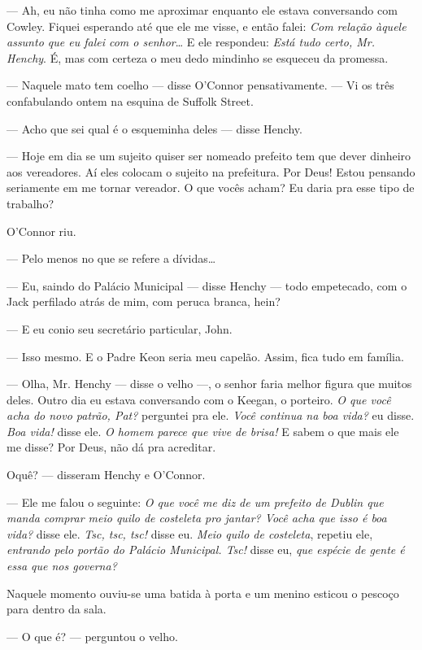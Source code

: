 --- Ah, eu não tinha como me aproximar enquanto ele estava conversando
com Cowley. Fiquei esperando até que ele me visse, e então falei:
\textit{Com relação àquele assunto que eu falei com o senhor}\ldots{} E ele respondeu:
\textit{Está tudo certo, Mr. Henchy}. É, mas com certeza o meu dedo mindinho se
esqueceu da promessa.

--- Naquele mato tem coelho --- disse O'Connor pensativamente. --- Vi
os três confabulando ontem na esquina de Suffolk Street.

--- Acho que sei qual é o esqueminha deles --- disse Henchy.

--- Hoje em dia se um sujeito quiser ser nomeado prefeito tem que
dever dinheiro aos vereadores. Aí eles colocam o sujeito na
prefeitura. Por Deus! Estou pensando seriamente em me tornar
vereador. O que vocês acham? Eu daria pra esse tipo de trabalho?

O'Connor riu.

--- Pelo menos no que se refere a dívidas\ldots{}

--- Eu, saindo do Palácio Municipal --- disse Henchy --- todo
empetecado, com o Jack perfilado atrás de mim, com peruca branca,
hein?

--- E eu conio seu secretário particular, John.

--- Isso mesmo. E o Padre Keon seria meu capelão. Assim, fica tudo em
família.

--- Olha, Mr. Henchy --- disse o velho ---, o senhor faria melhor
figura que muitos deles. Outro dia eu estava conversando com o Keegan,
o porteiro. \textit{O que você acha do novo patrão, Pat?} perguntei pra ele.
\textit{Você continua na boa vida?} eu disse. \textit{Boa vida!} disse
ele. \textit{O homem parece que vive de brisa!} E sabem o que mais ele me disse? Por Deus,
não dá pra acreditar.

Oquê? --- disseram Henchy e O'Connor.

--- Ele me falou o seguinte: \textit{O que você me diz de um prefeito de
Dublin que manda comprar meio quilo de costeleta pro jantar? Você acha
que isso é boa vida?} disse ele. \textit{Tsc, tsc, tsc!} disse eu.
\textit{Meio quilo de costeleta}, repetiu ele, \textit{entrando pelo portão do Palácio Municipal.
Tsc!} disse eu, \textit{que espécie de gente é essa que nos governa?}

Naquele momento ouviu-se uma batida à porta e um menino esticou o
pescoço para dentro da sala.

--- O que é? --- perguntou o velho.

